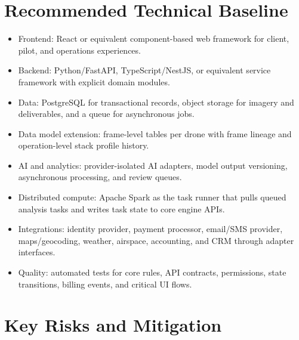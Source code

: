\documentclass[11pt,a4paper]{article}
\begin{document}
\section{Recommended Technical Baseline}

\begin{itemize}[leftmargin=*]
    \item Frontend: React or equivalent component-based web framework for client, pilot, and operations experiences.
    \item Backend: Python/FastAPI, TypeScript/NestJS, or equivalent service framework with explicit domain modules.
    \item Data: PostgreSQL for transactional records, object storage for imagery and deliverables, and a queue for asynchronous jobs.
    \item Data model extension: frame-level tables per drone with frame lineage and operation-level stack profile history.
    \item AI and analytics: provider-isolated AI adapters, model output versioning, asynchronous processing, and review queues.
    \item Distributed compute: Apache Spark as the task runner that pulls queued analysis tasks and writes task state to core engine APIs.
    \item Integrations: identity provider, payment processor, email/SMS provider, maps/geocoding, weather, airspace, accounting, and CRM through adapter interfaces.
    \item Quality: automated tests for core rules, API contracts, permissions, state transitions, billing events, and critical UI flows.
\end{itemize}

\section{Key Risks and Mitigation}
\end{document}
